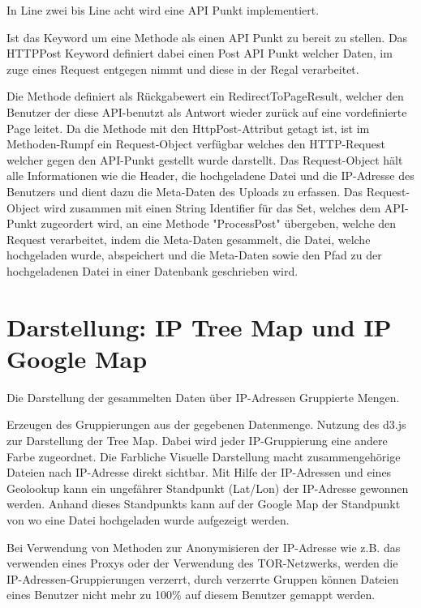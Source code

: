 \documentclass[
    fontsize=12pt,
    headings=small,
    parskip=half,           %
    bibliography=totoc,
    numbers=noenddot,       %
    open=any,               %
    ]{scrreprt}
\begin{document}
In Line zwei bis Line acht wird eine API Punkt implementiert. 

Ist das Keyword um eine Methode als einen API Punkt zu bereit zu stellen. Das HTTPPost Keyword definiert dabei einen Post API Punkt welcher Daten, im zuge eines Request entgegen nimmt und diese in der Regal verarbeitet. 


Die Methode definiert als Rückgabewert ein RedirectToPageResult, welcher den Benutzer der diese API-benutzt als Antwort wieder zurück auf eine vordefinierte Page leitet. 
Da die Methode mit den HttpPost-Attribut getagt ist, ist im Methoden-Rumpf ein Request-Object verfügbar welches den HTTP-Request welcher gegen den API-Punkt gestellt wurde darstellt. Das Request-Object hält alle Informationen wie die Header, die hochgeladene Datei und die IP-Adresse des Benutzers und dient dazu die Meta-Daten des Uploads zu erfassen. Das Request-Object wird zusammen mit einen String Identifier für das Set, welches dem API-Punkt zugeordert wird, an eine Methode "ProcessPost" übergeben, welche den Request verarbeitet, indem die Meta-Daten gesammelt, die Datei, welche hochgeladen wurde, abspeichert und die Meta-Daten sowie den Pfad zu der hochgeladenen Datei in einer Datenbank geschrieben wird.


\section{Darstellung: IP Tree Map und IP Google Map}

Die Darstellung der gesammelten Daten über IP-Adressen Gruppierte Mengen.

Erzeugen des Gruppierungen aus der gegebenen Datenmenge. Nutzung des d3.js zur Darstellung der Tree Map. Dabei wird jeder IP-Gruppierung eine andere Farbe zugeordnet. Die Farbliche Visuelle Darstellung macht zusammengehörige Dateien nach IP-Adresse direkt sichtbar. Mit Hilfe der IP-Adressen und eines Geolookup kann ein ungefährer Standpunkt (Lat/Lon) der IP-Adresse gewonnen werden. Anhand dieses Standpunkts kann auf der Google Map der Standpunkt von wo eine Datei hochgeladen wurde aufgezeigt werden. 

Bei Verwendung von Methoden zur Anonymisieren der IP-Adresse wie z.B. das verwenden eines Proxys oder der Verwendung des TOR-Netzwerks, werden die IP-Adressen-Gruppierungen verzerrt, durch verzerrte Gruppen können Dateien eines Benutzer nicht mehr zu 100\% auf diesem Benutzer gemappt werden.
\end{document}
